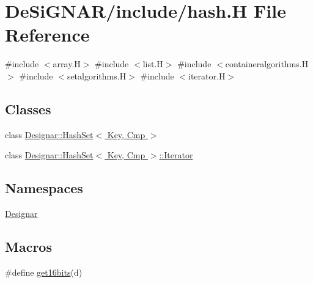 \hypertarget{hash_8_h}{}\section{De\+Si\+G\+N\+A\+R/include/hash.H File Reference}
\label{hash_8_h}
{\ttfamily \#include $<$array.\+H$>$}\newline
{\ttfamily \#include $<$list.\+H$>$}\newline
{\ttfamily \#include $<$containeralgorithms.\+H$>$}\newline
{\ttfamily \#include $<$setalgorithms.\+H$>$}\newline
{\ttfamily \#include $<$iterator.\+H$>$}\newline
\subsection*{Classes}
\begin{DoxyCompactItemize}
\item 
class \hyperlink{class_designar_1_1_hash_set}{Designar\+::\+Hash\+Set$<$ Key, Cmp $>$}
\item 
class \hyperlink{class_designar_1_1_hash_set_1_1_iterator}{Designar\+::\+Hash\+Set$<$ Key, Cmp $>$\+::\+Iterator}
\end{DoxyCompactItemize}
\subsection*{Namespaces}
\begin{DoxyCompactItemize}
\item 
 \hyperlink{namespace_designar}{Designar}
\end{DoxyCompactItemize}
\subsection*{Macros}
\begin{DoxyCompactItemize}
\item 
\#define \hyperlink{hash_8_h_abc7d71657be8975a51684e41029b7964}{get16bits}(d)
\end{DoxyCompactItemize}
